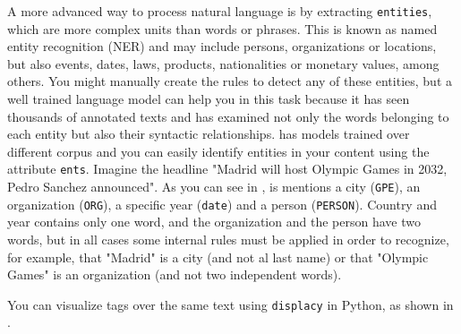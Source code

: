 A more advanced way to process natural language is by extracting \texttt{entities}, which are more complex units than words or phrases. This is known as named entity recognition (NER) and may include persons, organizations or locations, but also events, dates, laws, products, nationalities or monetary values, among others. You might manually create the rules to detect any of these entities, but a well trained language model can help you in this task because it has seen thousands of annotated texts and has examined not only the words belonging to each entity but also their syntactic relationships.  has models trained over different corpus and you can easily identify entities in your content using the attribute \verb|ents|. Imagine the headline "Madrid will host Olympic Games in 2032, Pedro Sanchez announced". As you can see in , is mentions a city (\texttt{GPE}), an organization (\texttt{ORG}), a specific year (\texttt{date}) and a person  (\texttt{PERSON}).  Country and year contains only one word, and the organization and the person have two words, but in all cases some internal rules must be applied in order to recognize, for example, that "Madrid" is a city (and not al last name) or that "Olympic Games" is an organization (and not two independent words).


You can visualize tags over the same text using \texttt{displacy}  in Python, as shown in .

